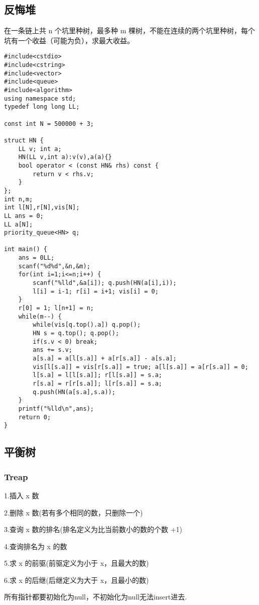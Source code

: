 \documentclass[UTF8]{ctexart}
\begin{document}
\subsection{反悔堆}

在一条链上共 n 个坑里种树，最多种 m 棵树，不能在连续的两个坑里种树，每个坑有一个收益（可能为负），求最大收益。

\begin{framed}
\begin{lstlisting}
#include<cstdio>
#include<cstring>
#include<vector>
#include<queue>
#include<algorithm>
using namespace std;
typedef long long LL;

const int N = 500000 + 3;

struct HN {
    LL v; int a;
    HN(LL v,int a):v(v),a(a){}
    bool operator < (const HN& rhs) const {
        return v < rhs.v;
    }
};
int n,m;
int l[N],r[N],vis[N];
LL ans = 0;
LL a[N];
priority_queue<HN> q;

int main() {
    ans = 0LL;
    scanf("%d%d",&n,&m);
    for(int i=1;i<=n;i++) {
        scanf("%lld",&a[i]); q.push(HN(a[i],i));
        l[i] = i-1; r[i] = i+1; vis[i] = 0;
    }
    r[0] = 1; l[n+1] = n;
    while(m--) {
        while(vis[q.top().a]) q.pop();
        HN s = q.top(); q.pop();
        if(s.v < 0) break;
        ans += s.v;
        a[s.a] = a[l[s.a]] + a[r[s.a]] - a[s.a];
        vis[l[s.a]] = vis[r[s.a]] = true; a[l[s.a]] = a[r[s.a]] = 0;
        l[s.a] = l[l[s.a]]; r[l[s.a]] = s.a;
        r[s.a] = r[r[s.a]]; l[r[s.a]] = s.a;
        q.push(HN(a[s.a],s.a));
    }
    printf("%lld\n",ans);
    return 0;
}
\end{lstlisting}
\end{framed}

\subsection{平衡树}
\subsubsection{Treap}
1.插入 x 数

2.删除 x 数(若有多个相同的数，只删除一个)

3.查询 x 数的排名(排名定义为比当前数小的数的个数 +1)

4.查询排名为 x 的数

5.求 x 的前驱(前驱定义为小于 x，且最大的数)

6.求 x 的后继(后继定义为大于 x，且最小的数)

所有指针都要初始化为null，不初始化为null无法insert进去.
\end{document}
